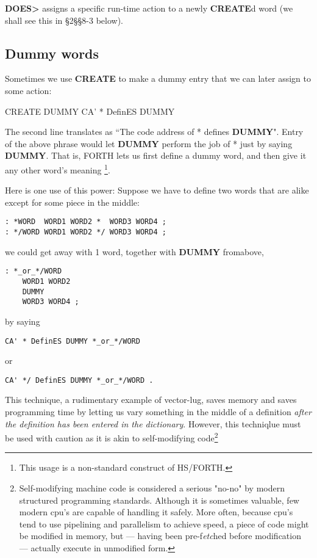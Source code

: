 \textbf{DOES>} assigns a specific run-time action to a newly \textbf{CREATE}d word (we shall see this in §2§§8-3 below).

\subsection{Dummy words}
Sometimes we use \textbf{CREATE} to make a dummy entry that we can later assign to some action:

CREATE DUMMY
CA' * DefinES DUMMY

The second line translates as ``The code address of * defines \textbf{DUMMY}". Entry of the above phrase would let \textbf{DUMMY} perform the job of * just by saying \textbf{DUMMY}. That is, FORTH lets us first define a dummy word, and then give it any other word’s meaning \footnote{This usage is a non-standard construct of HS/FORTH.}.

Here is one use of this power: Suppose we have to define two words that are alike except for some piece in the middle:
\begin{lstlisting}
: *WORD  WORD1 WORD2 *  WORD3 WORD4 ;
: */WORD WORD1 WORD2 */ WORD3 WORD4 ;
\end{lstlisting}

we could get away with 1 word, together with \textbf{DUMMY} fromabove,

\begin{lstlisting}
: *_or_*/WORD
    WORD1 WORD2
    DUMMY
    WORD3 WORD4 ;
\end{lstlisting}
by saying
\begin{lstlisting}
CA' * DefinES DUMMY *_or_*/WORD
\end{lstlisting}

or
\begin{lstlisting}
CA' */ DefinES DUMMY *_or_*/WORD .
\end{lstlisting}

This technique, a rudimentary example of vector-lug, saves memory and saves programming time by letting us vary something in the middle of a definition \textit{after the definition has been entered in the dictionary}. However, this techniqlue must be used with caution as it is akin to self-modifying code\footnote{Self-modifying machine code is considered a serious "no-no" by modern structured programming standards. Although it is sometimes valuable, few modern cpu's are capable of handling it safely. More often, because cpu's tend to use pipelining and parallelism to achieve speed, a piece of code might be modified in memory, but — having been pre-f\textit{etc}hed before modification — actually execute in unmodified form.}


